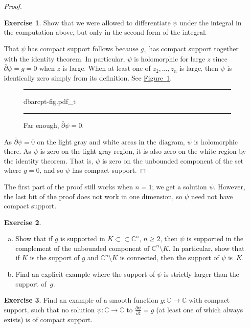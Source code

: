 \documentclass[12pt,openany]{book}
\newcommand{\C}{{\mathbb{C}}}
\theoremstyle{plain}
\theoremstyle{remark}
\theoremstyle{definition}
\newenvironment{exbox}{%
    \def\FrameCommand{\vrule width 1pt \relax\hspace{10pt}}%
    \MakeFramed{\advance\hsize-\width\FrameRestore}%
}{%
    \endMakeFramed
}
\newenvironment{exparts}{%
    \leavevmode\begin{enumerate}[a),noitemsep,topsep=0pt,parsep=0pt,partopsep=0pt]
}{%
    \end{enumerate}
}
\newenvironment{myfig}{%
\begin{figure}[h!t]
\noindent\rule{\textwidth}{0.5pt}\vspace{12pt}\par\centering}%
{\par\noindent\rule{\textwidth}{0.5pt}
\end{figure}}
\theoremstyle{exercise}
\newtheorem{exercise}{Exercise}[section]
\theoremstyle{example}
\newcommand{\figureref}[1]{\hyperref[#1]{Figure~\ref*{#1}}}
\begin{document}
\begin{proof}
\begin{exbox}
\begin{exercise}
Show that we were allowed to differentiate $\psi$
under the integral in the computation above, but only in the second form
of the integral.
\end{exercise}
\end{exbox}

That $\psi$ has compact support follows because $g_1$ has compact
support together with the identity theorem.  In particular, $\psi$ is
holomorphic for large $z$ since $\bar{\partial} \psi = g = 0$ when $z$
is large.  When at least one of $z_2,\ldots,z_n$ is large,
then $\psi$ is identically zero
simply from its definition.  See \figureref{fig:dbarcpt-fig}.

\begin{myfig}
{dbarcpt-fig.pdf_t}
\caption{Far enough, $\bar{\partial} \psi = 0$.\label{fig:dbarcpt-fig}}
\end{myfig}

As $\bar{\partial} \psi = 0$ on the light gray and white areas in the
diagram, $\psi$ is holomorphic there. As $\psi$ is zero on the light
gray region, it is also zero on the white region by the identity theorem.
That is, $\psi$ is zero on the unbounded component of the set where $g=0$,
and so $\psi$ has compact support.
\end{proof}

The first part of the proof still works when $n=1$; we get a solution
$\psi$.  However, the last bit of the proof does not work in one dimension, so
$\psi$ need not have compact support.

\begin{exbox}
\begin{exercise} \label{exercise:supportofpsi}
\begin{exparts}
\item
Show that if $g$ is supported in $K \subset \subset \C^n$, $n \geq 2$,
then $\psi$ is supported in the complement of the unbounded component
of $\C^n \setminus K$.  In particular, show that if $K$ is the support of
$g$ and $\C^n \setminus K$ is connected, then the support of
$\psi$ is~$K$.
\item
Find an explicit example where the support of $\psi$ is strictly larger
than the support of~$g$.
\end{exparts}
\end{exercise}

\begin{exercise}
Find an example of a smooth function $g \colon \C \to \C$ with compact
support, such that no solution $\psi \colon \C \to \C$ to
$\frac{\partial \psi}{\partial \bar{z}} = g$ (at least one of which always exists) is
of compact support.
\end{exercise}
\end{exbox}
\end{document}

